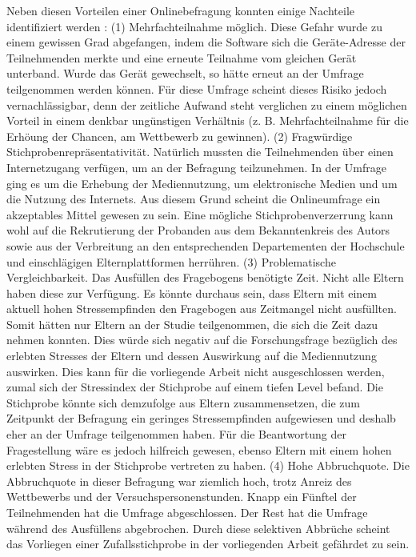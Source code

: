 Neben diesen Vorteilen einer Onlinebefragung konnten einige Nachteile identifiziert werden \cite{Rey2009}: (1) Mehrfachteilnahme möglich. Diese Gefahr wurde zu einem gewissen Grad abgefangen, indem die Software sich die Geräte-Adresse der Teilnehmenden merkte und eine erneute Teilnahme vom gleichen Gerät unterband. Wurde das Gerät gewechselt, so hätte erneut an der Umfrage teilgenommen werden können. Für diese Umfrage scheint dieses Risiko jedoch vernachlässigbar, denn der zeitliche Aufwand steht verglichen zu einem möglichen Vorteil in einem denkbar ungünstigen Verhältnis (z. B. Mehrfachteilnahme für die Erhöung der Chancen, am Wettbewerb zu gewinnen). (2) Fragwürdige Stichprobenrepräsentativität. Natürlich mussten die Teilnehmenden über einen Internetzugang verfügen, um an der Befragung teil\-zu\-nehmen. In der Umfrage ging es um die Erhebung der Mediennutzung, um elektronische Medien und um die Nutzung des Internets. Aus diesem Grund scheint die Onlineumfrage ein akzeptables Mittel gewesen zu sein. Eine mögliche Stichproben\-verzerrung kann wohl auf die Rekrutierung der Probanden aus dem Bekanntenkreis des Autors sowie aus der Verbreitung an den entsprechenden Departementen der Hochschule und einschlägigen Elternplattformen herrühren. (3) Problematische Vergleichbarkeit. Das Ausfüllen des Fragebogens benötigte Zeit. Nicht alle Eltern haben diese zur Verfügung. Es könnte durchaus sein, dass Eltern mit einem aktuell hohen Stressempfinden den Fragebogen aus Zeitmangel nicht ausfüllten. Somit hätten nur Eltern an der Studie teilgenommen, die sich die Zeit dazu nehmen konnten. Dies würde sich negativ auf die Forschungsfrage bezüglich des erlebten Stresses der Eltern und dessen Auswirkung auf die Mediennutzung auswirken. Dies kann für die vorliegende Arbeit nicht ausgeschlossen werden, zumal sich der Stressindex der Stichprobe auf einem tiefen Level befand. Die Stichprobe könnte sich demzufolge aus Eltern zusammen\-setzen, die zum Zeitpunkt der Befragung ein geringes Stressempfinden aufgewiesen und deshalb eher an der Umfrage teilgenommen haben. Für die Beantwortung der Fragestellung wäre es jedoch hilfreich gewesen, ebenso Eltern mit einem hohen erlebten Stress in der Stichprobe vertreten zu haben. (4) Hohe Abbruchquote. Die Abbruchquote in dieser Befragung war ziemlich hoch, trotz Anreiz des Wettbewerbs und der Versuchspersonenstunden. Knapp ein Fünftel der Teilnehmenden hat die Umfrage abgeschlossen. Der Rest hat die Umfrage während des Ausfüllens abgebrochen. Durch diese selektiven Abbrüche scheint das Vorliegen einer Zufallsstichprobe in der vorliegenden Arbeit gefährdet zu sein. 

